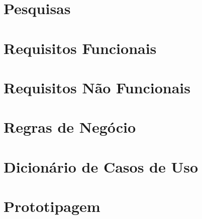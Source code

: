 \documentclass[
	article,			%
	12pt,				%
	oneside,			%
	a4paper,			%
    BIBLATEX,           %
	english,			%
	brazil,				%
	sumario=tradicional
	]{abntex2}
\begin{document}

\newpage
\begin{apendicesenv}

\chapter{Pesquisas\label{pesquisas}}



\newpage

\chapter{Requisitos Funcionais\label{requisitos_f}}



\newpage

\chapter{Requisitos Não Funcionais\label{requisitos_nf}}



\newpage

\chapter{Regras de Negócio\label{regras_negocio}}



\newpage

\chapter{Dicionário de Casos de Uso\label{dicionario_casos_uso}}



\newpage

\chapter{Prototipagem\label{prototipagem}}



\end{apendicesenv}

\end{document}
